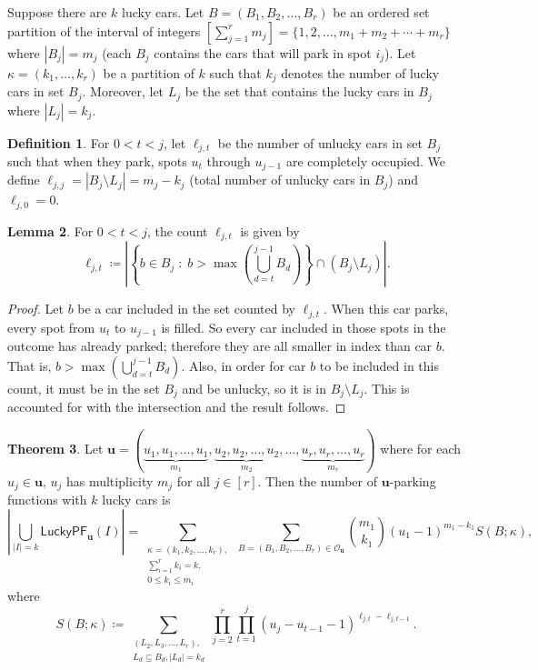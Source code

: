 \documentclass[reqno]{amsart}
\newcommand{\LPF}{\mathsf{LuckyPF}}
\theoremstyle{definition}
\newtheorem{theorem}{Theorem}[section]
\newtheorem{lemma}[theorem]{Lemma}
\newtheorem{definition}[theorem]{Definition}
\theoremstyle{remark}
\newcommand{\out}{\mathcal{O}}
\newcommand{\bsy}{\boldsymbol}
\begin{document}
Suppose there are $k$ lucky cars. Let $B=(B_1,B_2,\ldots,B_r)$ be an ordered set partition of the interval of integers $[\sum_{j=1}^r m_j]=\{1,2,\ldots, m_1+m_2+\cdots+m_r\}$ where $|B_j|=m_j$ (each $B_j$ contains the cars that will park in spot $i_j$). Let $\kappa = (k_1,\ldots, k_r)$ be a partition of $k$ such that $k_j$ denotes the number of lucky cars in set $B_j$. Moreover, let $L_j$ be the set that contains the lucky cars in $B_j$ where $|L_j|=k_j$. 


\begin{definition}
For $0<t<j$, let $\ell_{j,t} $ be the number of unlucky cars in set $B_j$ such that when they park, spots {$u_t$} through {$u_{j-1}$} are completely occupied. We define $\ell_{j,j}=|B_j\setminus L_j|=m_j-k_j$ (total number of unlucky cars in $B_j$) and $\ell_{j,0}=0$. 
\end{definition}
\begin{lemma}
For $0<t<j$, the count $\ell_{j,t} $ is given by
    \[
\ell_{j,t} \coloneq \left|\left\{ b\in B_j \; : \; b>\max\left(\bigcup_{d=t}^{j-1}B_d\right) \right\}  \cap \left(B_j\setminus L_j\right)\right| .
\]

\end{lemma}

\begin{proof}

Let $b$ be a car included in the set counted by $\ell_{j,t}$.
When this car parks, every spot from {$u_t$} to {$u_{j-1}$} is filled. So every car included in those spots in the outcome has already parked; therefore they are all smaller in index than car $b$. That is, $b>\max\left(\bigcup_{d=t}^{j-1}B_d\right)$. Also, in order for car $b$ to be included in this count, it must be in the set $B_j$ and be unlucky, so it is in $B_j \setminus L_j$. This is accounted for with the intersection and the result follows.
\end{proof}


\begin{theorem}\label{thm:countforupfs}
Let $\bsy{u}=(\underbrace{u_1,u_1,\ldots, u_1}_{m_1}, \underbrace{u_2,u_2,\ldots, u_2}_{m_2}, \ldots, \underbrace{u_r,u_r,\ldots ,u_r}_{m_r})$ where for each $u_j\in \bsy{u}$, $u_j$ has multiplicity $m_j$ for all $j\in [r]$. Then the number of $\bsy{u}$-parking functions with $k$ lucky cars is
\[ 
\left|\bigcup_{|I|=k} \LPF_{\bsy{u}}(I)\right| = 
\sum_{{\substack{\kappa = (k_1,k_2,\ldots, k_r), \\
\sum_{i=1}^{r}k_i=k,\\
0\leq k_i\leq m_i}}}
\,\sum_{{B = (B_1,B_2,\ldots, B_r) \in \out_{\bsy u}}}\binom{m_1}{k_1}(u_1-1)^{m_1-k_1} S(B ; \kappa),
\]
where
\[S(B;\kappa) \coloneq \sum_{{\substack{(L_2,L_3,\ldots,L_r), \\ L_d\subseteq B_d, |L_d|=k_d}}}\prod_{j=2}^r \prod_{t=1}^{j} (u_{j}-u_{t-1}-1)^{\ell_{j,t}-\ell_{j,t-1}}.\]

\end{theorem}
\end{document}
